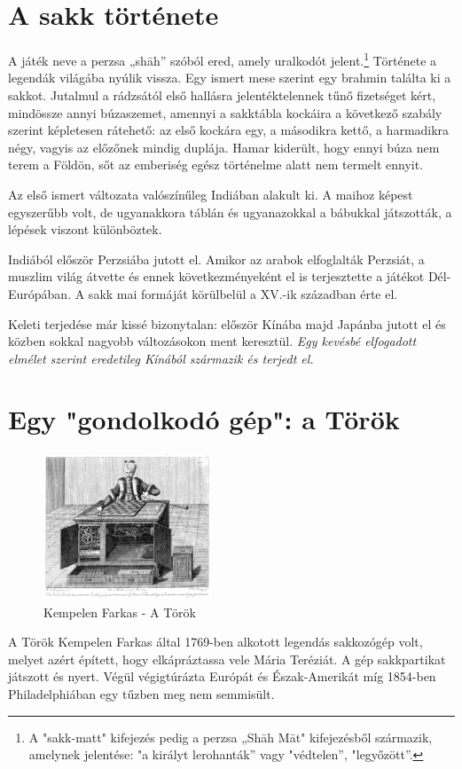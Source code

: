 \documentclass[twoside, a4paper, 12pt]{book}
\begin{document}
\section{A sakk története}
A játék neve a perzsa „shāh” szóból ered, amely uralkodót jelent.\footnote{A "sakk-matt" kifejezés pedig a perzsa „Shāh Māt" kifejezésből származik, amelynek jelentése: "a királyt lerohanták” vagy "védtelen”, "legyőzött”.\cite{ChessMateHu}\cite{ChessMateEn}} Története a legendák világába nyúlik vissza. Egy ismert mese szerint egy brahmin találta ki a sakkot. Jutalmul a rádzsától első hallásra jelentéktelennek tűnő fizetséget kért, mindössze annyi búzaszemet, amennyi a sakktábla kockáira a következő szabály szerint képletesen rátehető: az első kockára egy, a másodikra kettő, a harmadikra négy, vagyis az előzőnek mindig duplája. Hamar kiderült, hogy ennyi búza nem terem a Földön, sőt az emberiség egész történelme alatt nem termelt ennyit.

Az első ismert változata valószínűleg Indiában alakult ki. A maihoz képest egyszerűbb volt, de ugyanakkora táblán és ugyanazokkal a bábukkal játszották, a lépések viszont különböztek. 

Indiából először Perzsiába jutott el. Amikor az arabok elfoglalták Perzsiát, a muszlim világ átvette és ennek következményeként el is terjesztette a játékot Dél-Európában. A sakk mai formáját körülbelül a XV.-ik században érte el.

Keleti terjedése már kissé bizonytalan: először Kínába majd Japánba jutott el és közben sokkal nagyobb változásokon ment keresztül.
\textit{Egy kevésbé elfogadott elmélet szerint eredetileg Kínából származik és terjedt el.}\cite{HistoryOfChessHu}\cite{HistoryOfChessEn}

\section{Egy "gondolkodó gép": a Török}
\begin{figure}
	\caption{Kempelen Farkas - A Török}
	\label{fig:the_turk}
	\includegraphics[width=5.0cm]{img/the_turk}
\end{figure}
A Török Kempelen Farkas által 1769-ben alkotott legendás sakkozógép volt, melyet azért épített, hogy elkápráztassa vele Mária Teréziát. A gép sakkpartikat játszott és nyert. Végül végigtúrázta Európát és Észak-Amerikát míg 1854-ben Philadelphiában egy tűzben meg nem semmisült. 
\end{document}
